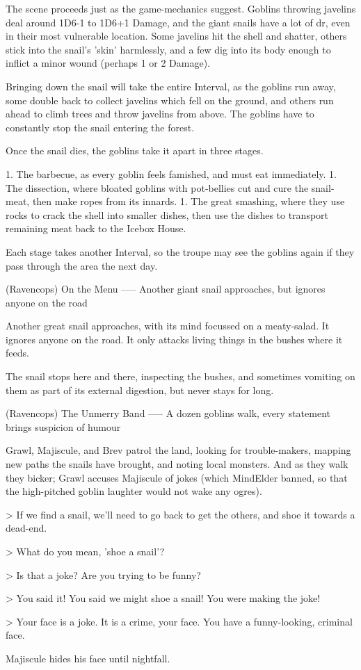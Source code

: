 The scene proceeds just as the game-mechanics suggest.
Goblins throwing javelins deal around 1D6-1 to 1D6+1 Damage, and the giant snails have a lot of \gls{dr}, even in their most vulnerable location.
Some javelins hit the shell and shatter, others stick into the snail's 'skin' harmlessly, and a few dig into its body enough to inflict a minor wound (perhaps 1 or 2 Damage).

Bringing down the snail will take the entire Interval, as the goblins run away, some double back to collect javelins which fell on the ground, and others run ahead to climb trees and throw javelins from above.
The goblins have to constantly stop the snail entering the forest.

Once the snail dies,
the goblins take it apart in three stages.

1. The barbecue, as every goblin feels famished, and must eat immediately.
1. The dissection, where bloated goblins with pot-bellies cut and cure the snail-meat, then make ropes from its innards.
1. The great smashing, where they use rocks to crack the shell into smaller dishes, then use the dishes to transport remaining meat back to the Icebox House.

Each stage takes another Interval, so the troupe may see the goblins again if they pass through the area the next day.

(Ravencops) On the Menu
-----
{Another giant snail approaches, but ignores anyone on the road}

Another great snail approaches, with its mind focussed on a meaty-salad.
It ignores anyone on the road.
It only attacks living things in the bushes where it feeds.

The snail stops here and there, inspecting the bushes, and sometimes vomiting on them as part of its external digestion, but never stays for long.


(Ravencops) The Unmerry Band
-----
{A dozen goblins walk, every statement brings suspicion of humour}

Grawl, Majiscule, and Brev patrol the land, looking for trouble-makers, mapping new paths the snails have brought, and noting local monsters.
And as they walk they bicker; Grawl accuses Majiscule of jokes (which MindElder banned, so that the high-pitched goblin laughter would not wake any ogres).

> If we find a snail, we'll need to go back to get the others, and shoe it towards a dead-end.

> What do you mean, 'shoe a snail'?

> Is that a joke?  Are you trying to be funny?

> You said it!  You said we might shoe a snail!  You were making the joke!

> Your face is a joke.  It is a crime, your face.  You have a funny-looking, criminal face.

Majiscule hides his face until nightfall.

